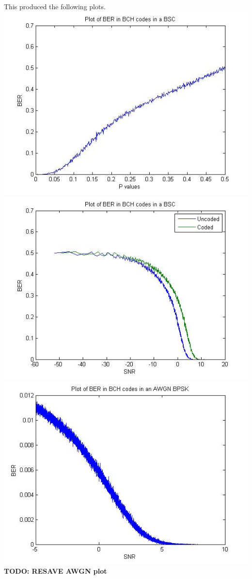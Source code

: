 \documentclass[a4paper]{article}
\begin{document}
This produced the following plots. \\
\includegraphics[scale=0.5]{plotBER_BSC_pvals.jpg} \\
\includegraphics[scale=0.5]{plotBER_BSC_SNR.jpg} \\
\includegraphics[scale=0.5]{plotBER_AWGN.jpg} \\
\textbf{TODO: RESAVE AWGN plot} 
\end{document}
